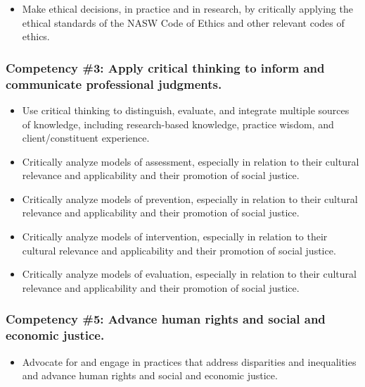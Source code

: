 \documentclass[11pt,]{article}
\providecommand{\tightlist}{%
  \setlength{\itemsep}{0pt}\setlength{\parskip}{0pt}}
\begin{document}
\begin{itemize}
\tightlist
\item
  Make ethical decisions, in practice and in research, by critically
  applying the ethical standards of the NASW Code of Ethics and other
  relevant codes of ethics.
\end{itemize}

\subsubsection{Competency \#3: Apply critical thinking to inform and
communicate professional
judgments.}\label{competency-3-apply-critical-thinking-to-inform-and-communicate-professional-judgments.}

\begin{itemize}
\tightlist
\item
  Use critical thinking to distinguish, evaluate, and integrate multiple
  sources of knowledge, including research-based knowledge, practice
  wisdom, and client/constituent experience.
\item
  Critically analyze models of assessment, especially in relation to
  their cultural relevance and applicability and their promotion of
  social justice.
\item
  Critically analyze models of prevention, especially in relation to
  their cultural relevance and applicability and their promotion of
  social justice.
\item
  Critically analyze models of intervention, especially in relation to
  their cultural relevance and applicability and their promotion of
  social justice.
\item
  Critically analyze models of evaluation, especially in relation to
  their cultural relevance and applicability and their promotion of
  social justice.
\end{itemize}

\subsubsection{Competency \#5: Advance human rights and social and
economic
justice.}\label{competency-5-advance-human-rights-and-social-and-economic-justice.}

\begin{itemize}
\tightlist
\item
  Advocate for and engage in practices that address disparities and
  inequalities and advance human rights and social and economic justice.
\end{itemize}
\end{document}
